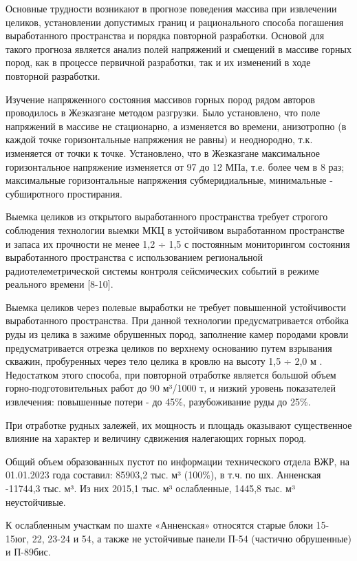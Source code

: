 \begin{multicols}{2}
Основные трудности возникают в прогнозе поведения массива при извлечении
целиков, установлении допустимых границ и рационального способа
погашения выработанного пространства и порядка повторной разработки.
Основой для такого прогноза является анализ полей напряжений и смещений
в массиве горных пород, как в процессе первичной разработки, так и их
изменений в ходе повторной разработки.

Изучение напряженного состояния массивов горных пород рядом авторов
проводилось в Жезказгане методом разгрузки. Было установлено, что поле
напряжений в массиве не стационарно, а изменяется во времени,
анизотропно (в каждой точке горизонтальные напряжения не равны) и
неоднородно, т.к. изменяется от точки к точке. Установлено, что в
Жезказгане максимальное горизонтальное напряжение изменяется от 97 до 12
МПа, т.е. более чем в 8 раз; максимальные горизонтальные напряжения
субмеридиальные, минимальные - субширотного простирания.

Выемка целиков из открытого выработанного пространства требует строгого
соблюдения технологии выемки МКЦ в устойчивом выработанном пространстве
и запаса их прочности не менее 1,2 ÷ 1,5 с постоянным мониторингом
состояния выработанного пространства с использованием региональной
радиотелеметрической системы контроля сейсмических событий в режиме
реального времени {[}8-10{]}.

Выемка целиков через полевые выработки не требует повышенной
устойчивости выработанного пространства. При данной технологии
предусматривается отбойка руды из целика в зажиме обрушенных пород,
заполнение камер породами кровли предусматривается отрезка целиков по
верхнему основанию путем взрывания скважин, пробуренных через тело
целика в кровлю на высоту 1,5 ÷ 2,0 м . Недостатком этого способа, при
повторной отработке является большой объем горно-подготовительных работ
до 90 м³/1000 т, и низкий уровень показателей извлечения: повышенные
потери - до 45\%, разубоживание руды до 25\%.

При отработке рудных залежей, их мощность и площадь оказывают
существенное влияние на характер и величину сдвижения налегающих горных
пород.

Общий объем образованных пустот по информации технического отдела ВЖР,
на 01.01.2023 года составил: 85903,2 тыс. м³ (100\%), в т.ч. по шх.
Анненская -11744,3 тыс. м³. Из них 2015,1 тыс. м³ ослабленные, 1445,8
тыс. м³ неустойчивые.

К ослабленным участкам по шахте «Анненская» относятся старые блоки
15-15юг, 22, 23-24 и 54, а также не устойчивые панели П-54 (частично
обрушенные) и П-89бис.


\end{multicols}
